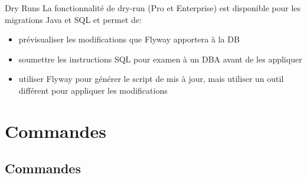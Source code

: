 \documentclass[slidestop,compress,11pt,xcolor=dvipsnames,french]{beamer}
\begin{document}
\begin{frame}{Dry Runs}
La fonctionnalité de dry-run (Pro et Enterprise) est disponible pour les migrations Java et SQL et permet de: 
\begin{itemize}
 \item prévisualiser les modifications que Flyway apportera à la DB
 \item soumettre les instructions SQL pour examen à un DBA avant de les appliquer
 \item utiliser Flyway pour générer le script de mis à jour, mais utiliser un outil différent pour appliquer les modifications
\end{itemize}
\end{frame}

\section{Commandes}
\subsection*{Commandes}
\end{document}

